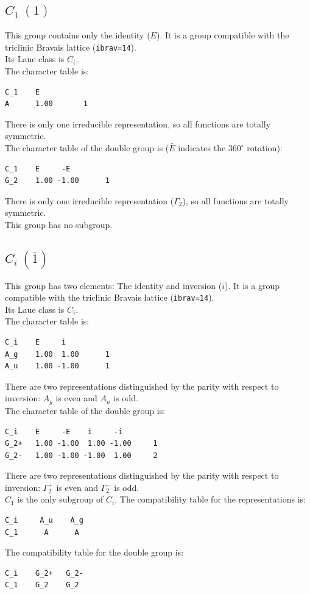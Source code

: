 \documentclass[12pt,a4paper]{article}
\begin{document}
\subsection{\color{web-blue}$C_1\ (1)$}
This group contains only the identity ($E$). 
It is a group compatible with the triclinic Bravais lattice 
(\texttt{ibrav=14}). \\
Its Laue class is $C_i$. \\
The character table is:
\begin{verbatim}
C_1    E    
A      1.00       1
\end{verbatim}
There is only one irreducible representation, so all functions are 
totally symmetric. \\
The character table of the double group is ($\bar E$ indicates the
$360^\circ$ rotation): 
\begin{verbatim}
C_1    E     -E   
G_2    1.00 -1.00      1
\end{verbatim}
There is only one irreducible representation ($\Gamma_2$), 
so all functions are totally symmetric. \\
This group has no subgroup.

\subsection{\color{web-blue}$C_i\ (\bar 1)$}
This group has two elements: The identity and inversion ($i$).
It is a group compatible with the triclinic Bravais lattice 
(\texttt{ibrav=14}). \\
Its Laue class is $C_i$. \\
The character table is:
\begin{verbatim}
C_i    E     i    
A_g    1.00  1.00      1
A_u    1.00 -1.00      1
\end{verbatim}
There are two representations distinguished by the parity
with respect to inversion: $A_g$ is even and $A_u$ is odd. \\
The character table of the double group is: 
\begin{verbatim}
C_i    E     -E    i     -i   
G_2+   1.00 -1.00  1.00 -1.00     1
G_2-   1.00 -1.00 -1.00  1.00     2
\end{verbatim}
There are two representations distinguished by the parity
with respect to inversion: $\Gamma_2^+$ is even and $\Gamma_2^-$ is odd.\\
$C_1$ is the only subgroup of $C_i$. The compatibility table for the
representations is:
\begin{verbatim}
C_i     A_u    A_g
C_1      A      A
\end{verbatim}
The compatibility table for the double group is:
\begin{verbatim}
C_i    G_2+   G_2- 
C_1    G_2    G_2
\end{verbatim}
\end{document}
